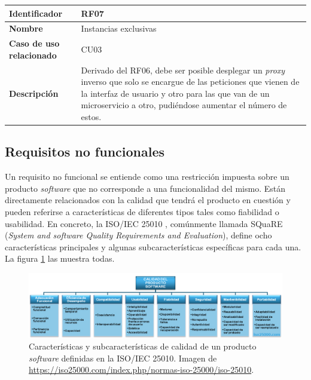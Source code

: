 \documentclass[11pt,spanish,listoffigures]{tfgetsinf}
\begin{document}
\begin{center} \begin{tabular}{| l | p{9.5cm} |}
\hline
\textbf{Identificador} & RF07
\\ \hline
\textbf{Nombre} & Instancias exclusivas
\\ \hline
\textbf{Caso de uso relacionado} & CU03
\\ \hline
\textbf{Descripción} & Derivado del RF06, debe ser posible desplegar un \emph{proxy} inverso que solo se encargue de las peticiones que vienen de la interfaz de usuario y otro para las que van de un microservicio a otro, pudiéndose aumentar el número de estos.
\\ \hline \end{tabular} \end{center}


		\subsection{Requisitos no funcionales} \label{requisitosNoFuncionales}
		
Un requisito no funcional se entiende como una restricción impuesta sobre un producto \emph{software} que no corresponde a una funcionalidad del mismo. Están directamente relacionados con la calidad que tendrá el producto en cuestión y pueden referirse a características de diferentes tipos tales como fiabilidad o usabilidad. En concreto, la ISO/IEC 25010 \cite{ISO25010}, comúnmente llamada SQuaRE (\emph{System and software Quality Requirements and Evaluation}), define ocho características principales y algunas subcaracterísticas específicas para cada una. La figura \ref{iso25010} las muestra todas.

\begin{figure}[ht]
\centering
\includegraphics[width=1\textwidth]{imagenes/iso25010}
\caption{Características y subcaracterísticas de calidad de un producto \emph{software} definidas en la ISO/IEC 25010. Imagen de \url{https://iso25000.com/index.php/normas-iso-25000/iso-25010}.}
	\label{iso25010}
\end{figure}
\end{document}

